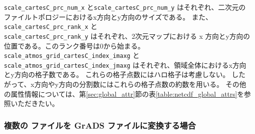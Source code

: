 
\verb|scale_cartesC_prc_num_x| と\verb|scale_cartesC_prc_num_y| はそれぞれ、二次元のファイルトポロジーにおけるx方向とy方向のサイズである。
また、\verb|scale_cartesC_prc_rank_x| と\\ \verb|scale_cartesC_prc_rank_y| はそれぞれ、2次元マップにおける x 方向とy方向の位置である。このランク番号は0から始まる。
\verb|scale_atmos_grid_cartesC_index_imaxg| と \verb|scale_atmos_grid_cartesC_index_jmaxg| はそれぞれ、領域全体におけるx方向とy方向の格子数である。
これらの格子点数にはハロ格子は考慮しない。
したがって、x方向やy方向の分割数にはこれらの格子点数の約数を用いる。
その他の属性情報については、第\ref{sec:global_attr}節の表\ref{table:netcdf_global_attrs}を参照いただきたい。


\subsubsection{複数の \scalenetcdf ファイルを GrADS ファイルに変換する場合}
%

